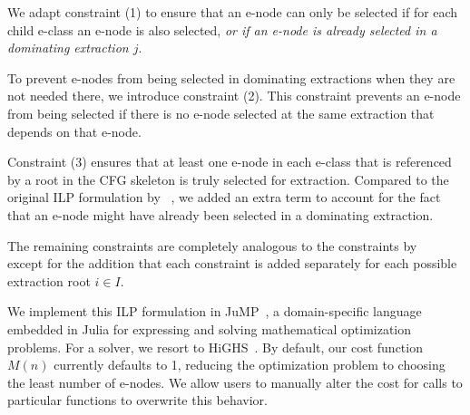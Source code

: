 We adapt constraint (1) to ensure that an e-node can only be selected if for each child e-class an e-node is also selected, \emph{or if an e-node is already selected in a dominating extraction $j$}.

To prevent e-nodes from being selected in dominating extractions when they are not needed there, we introduce constraint (2).
This constraint prevents an e-node from being selected if there is no e-node selected at the same extraction that depends on that e-node.

Constraint (3) ensures that at least one e-node in each e-class that is referenced by a root in the CFG skeleton is truly selected for extraction.
Compared to the original ILP formulation by \citeauthor{heImprovingTermExtraction2017}~\cite{heImprovingTermExtraction2017}, we added an extra term to account for the fact that an e-node might have already been selected in a dominating extraction.

The remaining constraints are completely analogous to the constraints by \citeauthor{heImprovingTermExtraction2017}~\cite{heImprovingTermExtraction2017} except for the addition that each constraint is added separately for each possible extraction root $i \in I$.

We implement this ILP formulation in JuMP~\cite{lubinJuMP10Recent2023}, a domain-specific language embedded in Julia for expressing and solving mathematical optimization problems.
For a solver, we resort to HiGHS~\cite{huangfuParallelizingDualRevised2018}.
By default, our cost function $M(n)$ currently defaults to 1, reducing the optimization problem to choosing the least number of e-nodes.
We allow users to manually alter the cost for calls to particular functions to overwrite this behavior.





